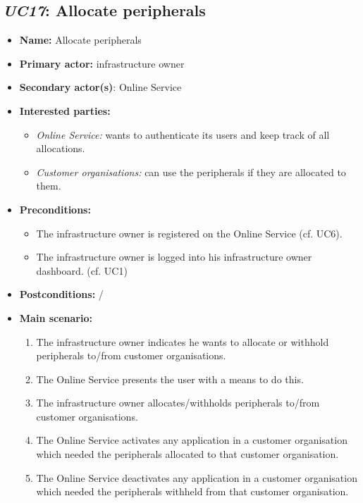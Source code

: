 \documentclass[english]{sareport}
\begin{document}
\subsection{\emph{UC17}: Allocate peripherals}
\begin{itemize}
    \item \textbf{Name:} Allocate peripherals
    \item \textbf{Primary actor:} infrastructure owner
    \item \textbf{Secondary actor(s)}: Online Service
    \item \textbf{Interested parties:} 
        \begin{itemize}
             \item \textit{Online Service:} wants to authenticate its users and keep track of all allocations.
             \item \textit{Customer organisations:} can use the peripherals if they are allocated to them.
        \end{itemize}

    \item \textbf{Preconditions:}
        \begin{itemize}
            \item The infrastructure owner is registered on the Online Service (cf. UC6).
            \item The infrastructure owner is logged into his infrastructure owner dashboard. (cf. UC1)
        \end{itemize}

    \item \textbf{Postconditions:}
    /

        
    \item \textbf{Main scenario:} 
    \begin{enumerate}
       \item The infrastructure owner indicates he wants to allocate or withhold peripherals to/from customer organisations.
       \item The Online Service presents the user with a means to do this.
       \item The infrastructure owner allocates/withholds peripherals to/from customer organisations.
       \item The Online Service activates any application in a customer organisation which needed the peripherals allocated to that customer organisation.
       \item The Online Service deactivates any application in a customer organisation which needed the peripherals withheld from that customer organisation.
    \end{enumerate}
\end{itemize}
\end{document}
